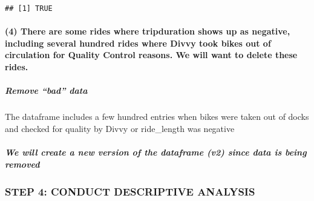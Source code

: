 \documentclass[
]{article}
\newenvironment{Shaded}{\begin{snugshade}}{\end{snugshade}}
\newcommand{\DecValTok}[1]{\textcolor[rgb]{0.00,0.00,0.81}{#1}}
\newcommand{\NormalTok}[1]{#1}
\newcommand{\OtherTok}[1]{\textcolor[rgb]{0.56,0.35,0.01}{#1}}
\newcommand{\SpecialCharTok}[1]{\textcolor[rgb]{0.00,0.00,0.00}{#1}}
\newcommand{\StringTok}[1]{\textcolor[rgb]{0.31,0.60,0.02}{#1}}
\begin{document}
\begin{verbatim}
## [1] TRUE
\end{verbatim}

\hypertarget{there-are-some-rides-where-tripduration-shows-up-as-negative-including-several-hundred-rides-where-divvy-took-bikes-out-of-circulation-for-quality-control-reasons.-we-will-want-to-delete-these-rides.}{%
\paragraph{(4) There are some rides where tripduration shows up as
negative, including several hundred rides where Divvy took bikes out of
circulation for Quality Control reasons. We will want to delete these
rides.}\label{there-are-some-rides-where-tripduration-shows-up-as-negative-including-several-hundred-rides-where-divvy-took-bikes-out-of-circulation-for-quality-control-reasons.-we-will-want-to-delete-these-rides.}}

\hypertarget{remove-bad-data}{%
\subparagraph{Remove ``bad'' data}\label{remove-bad-data}}

The dataframe includes a few hundred entries when bikes were taken out
of docks and checked for quality by Divvy or ride\_length was negative

\hypertarget{we-will-create-a-new-version-of-the-dataframe-v2-since-data-is-being-removed}{%
\subparagraph{We will create a new version of the dataframe (v2) since
data is being
removed}\label{we-will-create-a-new-version-of-the-dataframe-v2-since-data-is-being-removed}}

\begin{Shaded}
\end{Shaded}

\hypertarget{step-4-conduct-descriptive-analysis}{%
\subsubsection{STEP 4: CONDUCT DESCRIPTIVE
ANALYSIS}\label{step-4-conduct-descriptive-analysis}}
\end{document}
